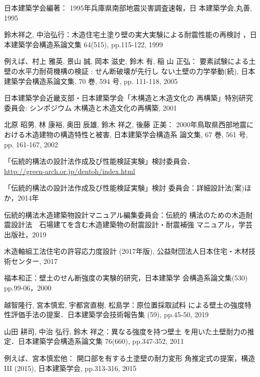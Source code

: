 \documentclass[11pt,a4paper,uplatex,dvipdfmx]{ujarticle} 		%
\newcommand{\研究課題名}{伝統的な木造土塗り壁の復元力に及ぼす軸組の影響に関する実験研究}
\newcommand{\研究機関名}{公立鳥取環境大学}
\newcommand{\研究代表者氏名}{中治弘行}
\newcommand{\私}{{\研究代表者氏名}}
\newcommand{\研究期間の最終元号年度}{8}  %
\begin{document}
\renewcommand{\refname}{\textbf{参考文献}\vspace{-0.5\baselineskip}}
\begin{thebibliography}{99}
  \itemsep=0pt
  \small
{} 日本建築学会編著： 1995年兵庫県南部地震災害調査速報，日
  本建築学会,丸善, 1995
  
 鈴木祥之, 中治弘行：木造住宅土塗り壁の実大実験による耐震性能の再検討
  ，日本建築学会構造系論文集 64(515), pp.115-122, 1999
  
 例えば、村上 雅英, 景山 誠, 岡本 滋史, 鈴木 有, 稲
  山 正弘： 要素試験による土壁の水平力耐荷機構の検証 : せん断破壊が先行し
  ない土壁の力学挙動(続), 日本建築学会構造系論文集, 70 巻, 594 号,
  pp. 111-118, 2005
  
 日本建築学会近畿支部・日本建築学会「木構造と木造文化の
  再構築」特別研究委員会: シンポジウム 木構造と木造文化の再構築, 2001
  
 北原 昭男, 林 康裕, 奥田 辰雄, 鈴木 祥之, 後藤 正美：
  2000年鳥取県西部地震における木造建物の構造特性と被害, 日本建築学会構造系
  論文集, 67 巻, 561 号, pp. 161-167, 2002
  
 「伝統的構法の設計法作成及び性能検証実験」検討委員会．\\
  \url{http://green-arch.or.jp/dentoh/index.html}
  
 「伝統的構法の設計法作成及び性能検証実験」検討
  委員会：詳細設計法(案)ほか，2014年
  
 伝統的構法木造建築物設計マニュアル編集委員会：伝統的
  構法のための木造耐震設計法　石場建てを含む木造建築物の耐震設計・耐震補強
  マニュアル，学芸出版社，2019
  
 木造軸組工法住宅の許容応力度設計 (2017年版),
  公益財団法人日本住宅・木材技術センター, 2017
  
 福本和正：壁土のせん断強度の実験的研究，日本建築学
  会構造系論文集(530) pp.99-06，2000
  
  越智隆行, 宮本慎宏, 宇都宮直樹, 松島学：原位置採取試料
  による壁土の強度特性評価手法の提案．日本建築学会技術報告集 (59),
  pp.45-50, 2019
  
 山田 耕司, 中治 弘行, 鈴木 祥之：異なる強度を持つ壁土
  を用いた土壁耐力の推定．日本建築学会構造系論文集 76(660), pp.347-352,
  2011
  
 例えば、宮本慎宏他： 開口部を有する土塗壁の耐力変形
  角推定式の提案，構造III (2015), 日本建築学会, pp.313-316, 2015
  		

\end{thebibliography}
\end{document}
